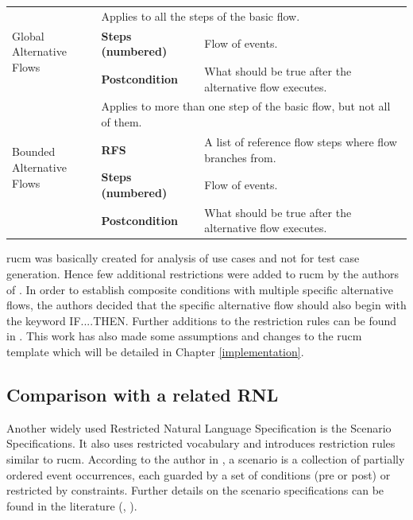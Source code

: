 \begin{table}[htbp]
\begin{adjustbox}{width=1\textwidth}
\begin{tabular}{|l|l|l|l|l|l|l|l|}
    \midrule
    \multicolumn{1}{|l|}{\multirow{3}[6]{*}{Global Alternative\newline{} Flows}} & \multicolumn{7}{l|}{ Applies to all the steps of the basic flow.} \\
\cmidrule{2-8}          & \textbf{Steps (numbered)} & \multicolumn{6}{l|}{ Flow of events.} \\
\cmidrule{2-8}          & \textbf{Postcondition} & \multicolumn{6}{l|}{ What should be true after the alternative flow executes.} \\
    \midrule
    \multicolumn{1}{|l|}{\multirow{4}[8]{*}{Bounded \newline{}Alternative Flows}} & \multicolumn{7}{l|}{Applies to more than one step of the basic flow, but not all of them.} \\
\cmidrule{2-8}          & \textbf{RFS} & \multicolumn{6}{l|}{ A list of reference flow steps where flow branches from.} \\
\cmidrule{2-8}          & \textbf{Steps (numbered)} & \multicolumn{6}{l|}{ Flow of events.} \\
\cmidrule{2-8}          & \textbf{Postcondition} & \multicolumn{6}{l|}{ What should be true after the alternative flow executes.} \\
    \bottomrule
    \end{tabular}%
	\end{adjustbox}
  \label{tab:rucmtemplate}%
\end{table}%


\gls{rucm} was basically created for analysis of use cases and not for test case generation. Hence few additional restrictions were added to \gls{rucm} by the authors of \cite{wang2015umtg}. In order to establish composite conditions with multiple specific alternative flows, the authors decided that the specific alternative flow should also begin with the keyword IF....THEN.  Further additions to the restriction rules can be found in \cite{wang2015umtg}. This work has also made some assumptions and changes to the \gls{rucm} template which will be detailed in Chapter \ref{implementation}.
 
\subsection{Comparison with a related RNL}
Another widely used Restricted Natural Language Specification is the Scenario Specifications. It also uses restricted vocabulary and introduces restriction rules similar to \gls{rucm}. According to the author in \cite{calisaya2016analysis}, a scenario is a collection of partially ordered event occurrences, each guarded by a set of conditions (pre or post) or restricted by constraints. Further details on the scenario specifications can be found in the literature (\cite{do2000scenario}, \cite{calisaya2016analysis}).

